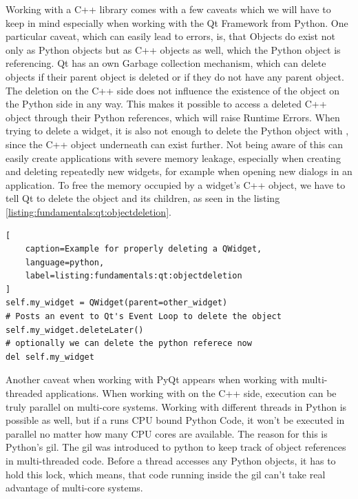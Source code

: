 Working with a C++ library comes with a few caveats which we will have to keep
in mind especially when working with the Qt Framework from Python. One
particular caveat, which can easily lead to errors, is, that Objects do exist
not only as Python objects but as C++ objects as well, which the Python object
is referencing. Qt has an own Garbage collection mechanism, which can delete
objects if their parent object is deleted or if they do not have any parent
object. The deletion on the C++ side does not influence the existence of the
object on the Python side in any way. This makes it possible to access a deleted
C++ object through their Python references, which will raise Runtime Errors.
When trying to delete a widget, it is also not enough to delete the Python
object with , since the C++ object
underneath can exist further. Not being aware of this can easily create
applications with severe memory leakage, especially when creating and deleting
repeatedly new widgets, for example when opening new dialogs in an application.
To free the memory occupied by a widget's C++ object, we have to tell Qt to
delete the object and its children, as seen in the listing
\ref{listing:fundamentals:qt:objectdeletion}.

\begin{lstlisting}[
    caption=Example for properly deleting a QWidget,
    language=python, 
    label=listing:fundamentals:qt:objectdeletion
]
self.my_widget = QWidget(parent=other_widget)
# Posts an event to Qt's Event Loop to delete the object
self.my_widget.deleteLater()
# optionally we can delete the python referece now
del self.my_widget
\end{lstlisting}

Another caveat when working with PyQt appears when working with multi-threaded
applications. When working with  on the C++
side, execution can be truly parallel on multi-core systems. Working with
different threads in Python is possible as well, but if a
 runs CPU bound Python Code, it won't be
executed in parallel no matter how many CPU cores are available. The reason for
this is Python's \gls{gil}. The \gls{gil} was introduced to python to keep track
of object references in multi-threaded code. Before a thread accesses any Python
objects, it has to hold this lock, which means, that code running inside the
\gls{gil} can't take real advantage of multi-core systems.
\cite{PythonGil, PythonGilDocs}

